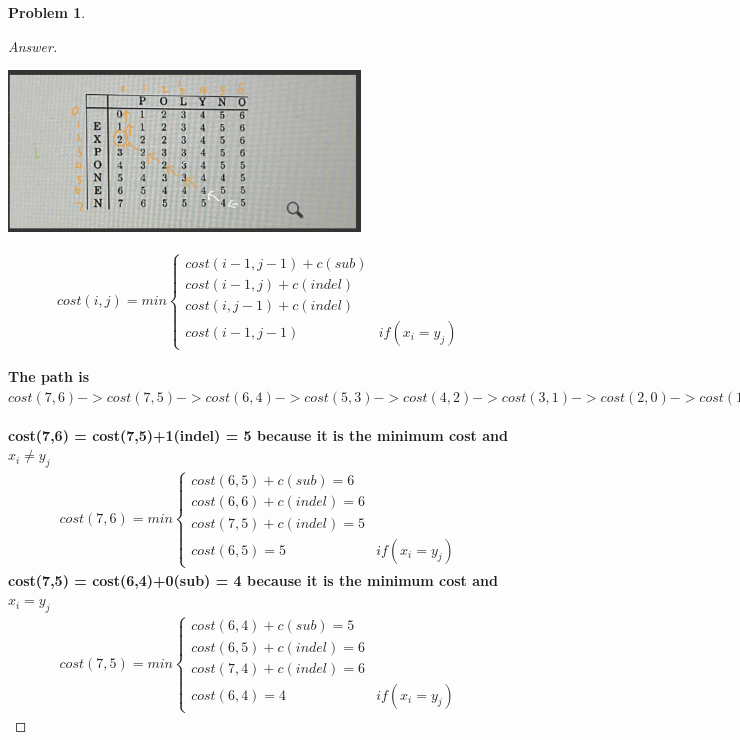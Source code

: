 \documentclass[11pt]{article}
\theoremstyle{definition}
\theoremstyle{definition}
\newtheorem{required}{Problem}
\theoremstyle{definition}
\begin{document}
\begin{required}
\begin{proof}[Answer]
\begin{center}
\includegraphics[width=0.7\textwidth]{IMG_0509.PNG}
\end{center}
\begin{align*}
cost(i,j) = min\begin{cases}
cost(i-1,j-1) + c(sub) \\
cost(i-1,j) + c(indel) \\
cost(i,j-1) + c(indel)\\
cost(i-1,j-1) & if (x_i = y_j)
\end{cases}
\end{align*}

\textbf{The path is $cost(7,6) -> cost(7,5) -> cost(6,4) -> cost(5,3) -> cost(4,2) -> cost(3,1) ->cost(2,0) -> cost(1,0) ->cost(0,0)$}\\
\\\textbf{cost(7,6) = cost(7,5)+1(indel) = 5 because it is the minimum cost and $x_i \neq y_j$}\\
\begin{align*}
cost(7,6) = min\begin{cases}
cost(6,5) + c(sub) = 6 \\
cost(6,6) + c(indel) = 6\\
cost(7,5) + c(indel) = 5\\
cost(6,5) = 5 & if (x_i = y_j)
\end{cases}
\end{align*}
\newpage
\textbf{cost(7,5) = cost(6,4)+0(sub) = 4 because it is the minimum cost and$ x_i = y_j$}\\
\begin{align*}
cost(7,5) = min\begin{cases}
cost(6,4) + c(sub) = 5 \\
cost(6,5) + c(indel) = 6\\
cost(7,4) + c(indel) = 6\\
cost(6,4) = 4 & if (x_i = y_j)
\end{cases}
\end{align*}


\end{proof}
\end{required}
\end{document}
